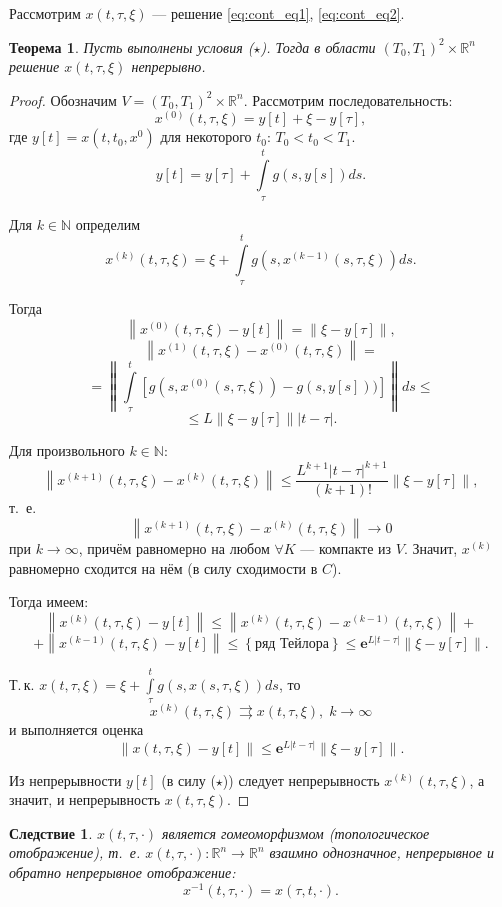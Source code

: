 \documentclass[12pt, a4paper]{article}
\theoremstyle{rusdef}
\newtheorem{theorem}{Теорема}
\newtheorem{corol}{Следствие}
\newcommand\abs[1]{\left\lvert #1 \right\rvert} %
\newcommand{\R}{\ensuremath{\mathbb{R}}} %
\newcommand{\N}{\ensuremath{\mathbb{N}}} %
\newcommand{\e}{\mathbf{e}}
\newcommand{\norm}[1]{\left\lVert #1 \right\rVert} %
\begin{document}
Рассмотрим $x(t, \tau, \xi)$ --- решение \eqref{eq:cont_eq1}, \eqref{eq:cont_eq2}.
\begin{theorem}
Пусть выполнены условия ($\star$). Тогда в области $(T_0, T_1)^2 \times \R^n$ решение $x(t, \tau, \xi)$ непрерывно.
\end{theorem}
\begin{proof}
Обозначим $V = (T_0, T_1) ^ 2 \times \R^n$. Рассмотрим последовательность:
$$
x^{(0)}(t,\tau,\xi) = y[t] + \xi - y[\tau],
$$
где $y[t] = x(t, t_0, x^0)$ для некоторого $t_0$: $T_0 < t_0 < T_1$.
$$
y[t] = y[\tau] + \int\limits_{\tau}^{t} g(s, y[s]) ds.
$$

Для $k \in \N$ определим
$$
x^{(k)}(t, \tau, \xi) = \xi + \int\limits_{\tau}^{t} g(s, x^{(k-1)}(s, \tau, \xi)) ds.
$$

Тогда
$$
\norm{x^{(0)} (t, \tau, \xi) - y[t]} = \norm{\xi - y[\tau]},
$$
$$
\norm{x^{(1)}(t, \tau, \xi) - x^{(0)}(t, \tau, \xi)} =
$$
$$
= \norm{\int\limits_{\tau}^{t} \left[ g\left(s, x^{(0)}(s, \tau, \xi)\right) - g(s, y[s])) \right]} ds \leqslant
$$
$$
\leqslant L \norm{\xi - y[\tau]} \abs{t - \tau}.
$$

Для произвольного $k \in \N$:
$$
\norm{ x^{(k+1)} (t, \tau, \xi) - x^{(k)} (t, \tau, \xi) } \leqslant \dfrac{L^ {k+1} \abs{t - \tau}^{k+1}}{(k+1)!} \norm{\xi - y[\tau]},
$$
т.~е.
$$
\norm{ x^{(k+1)} (t, \tau, \xi) - x^{(k)} (t, \tau, \xi) } \to 0
$$
при $k \to \infty$, причём равномерно на любом $\forall K$ --- компакте из $V$. Значит, $x^{(k)}$ равномерно сходится на нём (в силу сходимости в $C$).

Тогда имеем:
$$
\norm{ x^{(k)}(t, \tau, \xi) - y[t]} \leqslant \norm{x^{(k)} (t, \tau, \xi) - x^{(k - 1)}(t, \tau, \xi)} +
$$
$$
+ \norm{ x^{(k-1)}(t, \tau, \xi) - y[t]} \leqslant \left\{ \text{ряд Тейлора} \right\} \leqslant \e^{L \abs{t - \tau}} \norm{\xi - y[\tau]}.
$$

Т.\,к. $x(t, \tau, \xi) = \xi + \int\limits_{\tau}^{t} g(s, x(s, \tau, \xi))ds$, то $$
x^{(k)}(t, \tau, \xi) \rightrightarrows x(t, \tau, \xi), \; k \to \infty
$$
и выполняется оценка
$$
\norm{x(t, \tau, \xi) - y[t]} \leqslant \e^{L \abs{t - \tau}} \norm{\xi - y[\tau]}.
$$

Из непрерывности $y[t]$ (в силу ($\star$)) следует непрерывность $x^{(k)}(t, \tau, \xi)$, а значит, и непрерывность $x(t, \tau, \xi)$.
\end{proof}

\begin{corol}
$x(t, \tau, \cdot)$ является гомеоморфизмом (топологическое отображение), т.~е. $x(t, \tau, \cdot) \colon \R^n \to \R^n$ взаимно однозначное, непрерывное и обратно непрерывное отображение:
$$
x^{-1}(t, \tau, \cdot) = x(\tau, t, \cdot).
$$
\end{corol}
\end{document}
